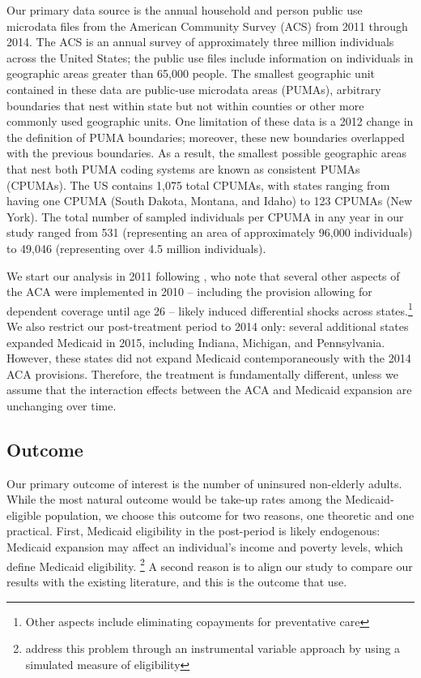 \documentclass[final]{article}
\begin{document}
Our primary data source is the annual household and person public use microdata files from the American Community Survey (ACS) from 2011 through 2014. The ACS is an annual survey of approximately three million individuals across the United States; the public use files include information on individuals in geographic areas greater than 65,000 people. The smallest geographic unit contained in these data are public-use microdata areas (PUMAs), arbitrary boundaries that nest within state but not within counties or other more commonly used geographic units. One limitation of these data is a 2012 change in the definition of PUMA boundaries; moreover, these new boundaries overlapped with the previous boundaries. As a result, the smallest possible geographic areas that nest both PUMA coding systems are known as consistent PUMAs (CPUMAs). The US contains 1,075 total CPUMAs, with states ranging from having one CPUMA (South Dakota, Montana, and Idaho) to 123 CPUMAs (New York). The total number of sampled individuals per CPUMA in any year in our study ranged from 531 (representing an area of approximately 96,000 individuals) to 49,046 (representing over 4.5 million individuals). 

We start our analysis in 2011 following \cite{courtemanche2017early}, who note that several other aspects of the ACA were implemented in 2010 -- including the provision allowing for dependent coverage until age 26 -- likely induced differential shocks across states.\footnote{Other aspects include eliminating copayments for preventative care} We also restrict our post-treatment period to 2014 only: several additional states expanded Medicaid in 2015, including Indiana, Michigan, and Pennsylvania. However, these states did not expand Medicaid contemporaneously with the 2014 ACA provisions. Therefore, the treatment is fundamentally different, unless we assume that the interaction effects between the ACA and Medicaid expansion are unchanging over time. 

\subsection{Outcome}

Our primary outcome of interest is the number of uninsured non-elderly adults. While the most natural outcome would be take-up rates among the Medicaid-eligible population, we choose this outcome for two reasons, one theoretic and one practical. First, Medicaid eligibility in the post-period is likely endogenous: Medicaid expansion may affect an individual's income and poverty levels, which define Medicaid eligibility. \footnote{\cite{frean2017premium} address this problem through an instrumental variable approach by using a simulated measure of eligibility} A second reason is to align our study to compare our results with the existing literature, and this is the outcome that \cite{courtemanche2017early} use. 
\end{document}
